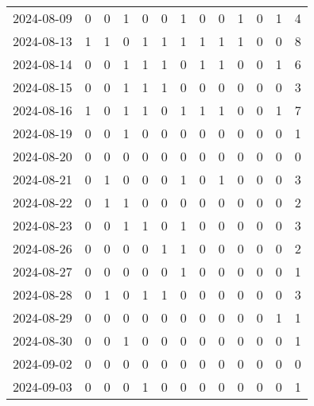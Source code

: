 \documentclass[dvipdfmx,oneside]{article}
\begin{document}
\begin{longtable}{lcccccccccccc}
        2024-08-09 &     0 &     0 &     1 &     0 &     0 &     1 &     0 &     0 &     1 &     0 &     1 &      4 \\
        2024-08-13 &     1 &     1 &     0 &     1 &     1 &     1 &     1 &     1 &     1 &     0 &     0 &      8 \\
        2024-08-14 &     0 &     0 &     1 &     1 &     1 &     0 &     1 &     1 &     0 &     0 &     1 &      6 \\
        2024-08-15 &     0 &     0 &     1 &     1 &     1 &     0 &     0 &     0 &     0 &     0 &     0 &      3 \\
        2024-08-16 &     1 &     0 &     1 &     1 &     0 &     1 &     1 &     1 &     0 &     0 &     1 &      7 \\
        2024-08-19 &     0 &     0 &     1 &     0 &     0 &     0 &     0 &     0 &     0 &     0 &     0 &      1 \\
        2024-08-20 &     0 &     0 &     0 &     0 &     0 &     0 &     0 &     0 &     0 &     0 &     0 &      0 \\
        2024-08-21 &     0 &     1 &     0 &     0 &     0 &     1 &     0 &     1 &     0 &     0 &     0 &      3 \\
        2024-08-22 &     0 &     1 &     1 &     0 &     0 &     0 &     0 &     0 &     0 &     0 &     0 &      2 \\
        2024-08-23 &     0 &     0 &     1 &     1 &     0 &     1 &     0 &     0 &     0 &     0 &     0 &      3 \\
        2024-08-26 &     0 &     0 &     0 &     0 &     1 &     1 &     0 &     0 &     0 &     0 &     0 &      2 \\
        2024-08-27 &     0 &     0 &     0 &     0 &     0 &     1 &     0 &     0 &     0 &     0 &     0 &      1 \\
        2024-08-28 &     0 &     1 &     0 &     1 &     1 &     0 &     0 &     0 &     0 &     0 &     0 &      3 \\
        2024-08-29 &     0 &     0 &     0 &     0 &     0 &     0 &     0 &     0 &     0 &     0 &     1 &      1 \\
        2024-08-30 &     0 &     0 &     1 &     0 &     0 &     0 &     0 &     0 &     0 &     0 &     0 &      1 \\
        2024-09-02 &     0 &     0 &     0 &     0 &     0 &     0 &     0 &     0 &     0 &     0 &     0 &      0 \\
        2024-09-03 &     0 &     0 &     0 &     1 &     0 &     0 &     0 &     0 &     0 &     0 &     0 &      1 \\

\end{longtable}
\end{document}
